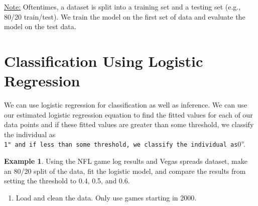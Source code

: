 \documentclass[
  11pt,
]{book}
\providecommand{\tightlist}{%
  \setlength{\itemsep}{0pt}\setlength{\parskip}{0pt}}
\theoremstyle{definition}
\theoremstyle{definition}
\newtheorem{example}{Example}[chapter]
\theoremstyle{definition}
\theoremstyle{definition}
\theoremstyle{remark}
\begin{document}
\underline{Note:} Oftentimes, a dataset is split into a training set and a testing set (e.g., 80/20 train/test). We train the model on the first set of data and evaluate the model on the test data.

\newpage

\hypertarget{classification-using-logistic-regression}{%
\section{Classification Using Logistic Regression}\label{classification-using-logistic-regression}}

We can use logistic regression for classification as well as inference. We can use our estimated logistic regression equation to find the fitted values for each of our data points and if these fitted values are greater than some threshold, we classify the individual as \texttt{1"\ and\ if\ less\ than\ some\ threshold,\ we\ classify\ the\ individual\ as}0''.

\begin{example}
Using the NFL game log results and Vegas spreads dataset, make an 80/20 split of the data, fit the logistic model, and compare the results from setting the threshold to 0.4, 0.5, and 0.6.
\end{example}

\begin{enumerate}
\def\labelenumi{(\alph{enumi})}
\tightlist
\item
  Load and clean the data. Only use games starting in 2000.
\end{enumerate}
\end{document}
